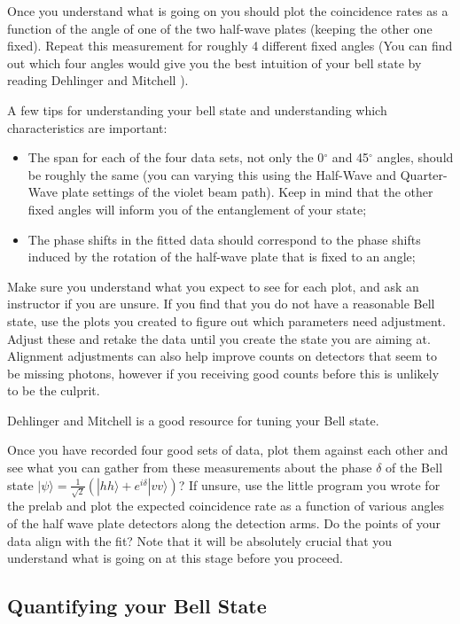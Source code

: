 \documentclass{../lab}
\begin{document}
Once you understand what is going on you should plot the coincidence rates as a function of the angle of one of the two half-wave plates (keeping the other one fixed). Repeat this measurement for roughly 4 different fixed angles (You can find out which four angles would give you the best intuition of your bell state by reading Dehlinger and Mitchell \cite{Dehlinger}).

A few tips for understanding your bell state and understanding which characteristics are important:

\begin{itemize}
    \item The span for each of the four data sets, not only the 0$^\circ$ and 45$^\circ$ angles, should be roughly the same (you can varying this using the Half-Wave and Quarter-Wave plate settings of the violet beam path). Keep in mind that the other fixed angles will inform you of the entanglement of your state;

    \item The phase shifts in the fitted data should correspond to the phase shifts induced by the rotation of the half-wave plate that is fixed to an angle;
\end{itemize}

Make sure you understand what you expect to see for each plot, and ask an instructor if you are unsure. If you find that you do not have a reasonable Bell state, use the plots you created to figure out which parameters need adjustment. Adjust these and retake the data until you create the state you are aiming at. Alignment adjustments can also help improve counts on detectors that seem to be missing photons, however if you receiving good counts before this is unlikely to be the culprit.

Dehlinger and Mitchell \cite{Dehlinger} is a good resource for tuning your Bell state.

Once you have recorded four good sets of data, plot them against each other and see what you can gather from these measurements about the phase $\delta$ of the Bell state $|\psi \rangle = \frac{1}{\sqrt{2}} (|hh\rangle + e^{i\delta} |vv\rangle)$? If unsure, use the little program you wrote for the prelab and plot the expected coincidence rate as a function of various angles of the half wave plate detectors along the detection arms. Do the points of your data align with the fit? Note that it will be absolutely crucial that you understand what is going on at this stage before you proceed.

\subsection{Quantifying your Bell State}
\end{document}
